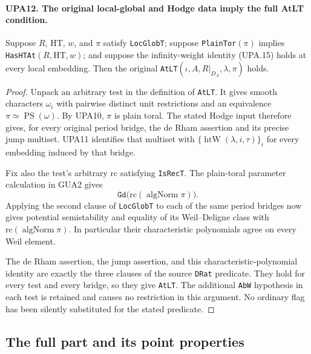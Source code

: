 \documentclass[11pt,a4paper]{article}
\numberwithin{equation}{section}
\theoremstyle{remark}\newtheorem{remark}[theorem]{Remark}
\begin{document}
\paragraph{UPA12. The original local-global and Hodge data imply the full AtLT condition.}
\label{claim:UPA12}
Suppose $R$, $\mathrm{HT}$, $w$, and $\pi$ satisfy
\texttt{Loc\allowbreak Glob\allowbreak T}; suppose
\texttt{Plain\allowbreak Tor}$(\pi)$ implies
\texttt{Has\allowbreak HTAt}$(R,\mathrm{HT},w)$; and suppose the
infinity-weight identity (UPA.15) holds at every local
embedding.  Then the original
\texttt{At\allowbreak LT}$(\iota,A,R|_{D_A},\lambda,\pi)$ holds.
\begin{proof}
Unpack an arbitrary test in the definition of
\texttt{At\allowbreak LT}.  It gives smooth characters $\omega_i$
with pairwise distinct unit restrictions and an
equivalence $\pi\simeq\operatorname{PS}(\omega)$.
By UPA10, $\pi$ is plain toral.  The stated Hodge input
therefore gives, for every original period bridge,
the de Rham assertion and its precise jump multiset.
UPA11 identifies that multiset with
$\{\operatorname{htW}(\lambda,i,\tau)\}_i$ for every
embedding induced by that bridge.

Fix also the test's arbitrary $\mathrm{rc}$ satisfying
\texttt{Is\allowbreak Rec\allowbreak T}.  The plain-toral parameter calculation in
GUA2 gives
\[
           \texttt{Gd}\bigl(\mathrm{rc}
                      (\operatorname{algNorm}\pi)\bigr).
 \tag{UPA.18}
\]
Applying the second clause of \texttt{Loc\allowbreak Glob\allowbreak T} to each
of the same period bridges now gives potential
semistability and equality of its Weil--Deligne class
with $\mathrm{rc}(\operatorname{algNorm}\pi)$.
In particular their characteristic polynomials agree
on every Weil element.

The de Rham assertion, the jump assertion, and this
characteristic-polynomial identity are exactly the
three clauses of the source \texttt{DRat} predicate.
They hold for every test and every bridge, so they
give \texttt{At\allowbreak LT}.  The additional \texttt{Ab\allowbreak W}
hypothesis in each test is retained and causes no
restriction in this argument.  No ordinary flag has
been silently substituted for the stated predicate.
\end{proof}

\subsection{The full part and its point properties}
\end{document}
